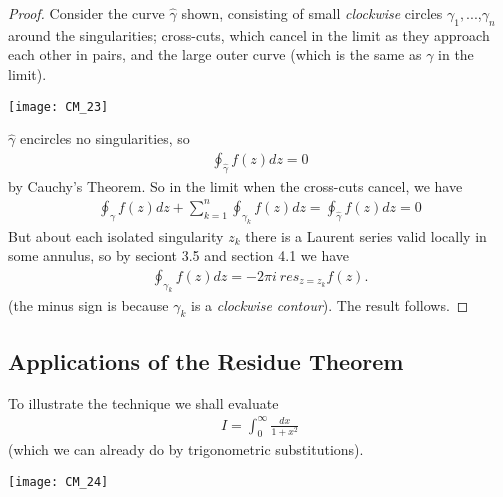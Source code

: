 \documentclass[a4paper]{article}
\begin{document}
\begin{proof}
Consider the curve $\hat{\gamma}$ shown, consisting of small \emph{clockwise} circles $\gamma_1,$...,$\gamma_n$ around the singularities; cross-cuts, which cancel in the limit as they approach each other in pairs, and the large outer curve (which is the same as $\gamma$ in the limit). 

\texttt{[image: CM\_23]}

$\hat{\gamma}$ encircles no singularities, so
\begin{equation*}
\begin{aligned}
\oint_{\hat{\gamma}} f(z) dz = 0
\end{aligned}
\end{equation*}
by Cauchy's Theorem. So in the limit when the cross-cuts cancel, we have
\begin{equation*}
\begin{aligned}
\oint_\gamma f(z) dz + \sum_{k=1}^n \oint_{\gamma_k} f(z) dz = \oint_{\hat{\gamma}} f(z) dz = 0
\end{aligned}
\end{equation*}
But about each isolated singularity $z_k$ there is a Laurent series valid locally in some annulus, so by seciont 3.5 and section 4.1 we have
\begin{equation*}
\begin{aligned}
\oint_{\gamma_k} f(z) dz=-2\pi i \ res_{z=z_k} f(z).
\end{aligned}
\end{equation*}
(the minus sign is because $\gamma_k$ is a \emph{clockwise contour}). The result follows.
\end{proof}

\subsection{Applications of the Residue Theorem}
To illustrate the technique we shall evaluate
\begin{equation*}
\begin{aligned}
I = \int_0^\infty \frac{dx}{1+x^2}
\end{aligned}
\end{equation*}
(which we can already do by trigonometric substitutions).

\texttt{[image: CM\_24]}
\end{document}
